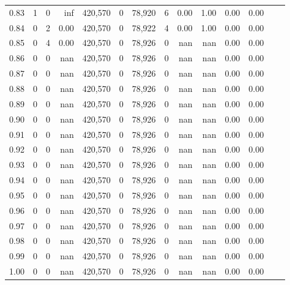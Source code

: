 \begin{tabular}{rrrrrrrrrrrrrr}
0.83 &       1 &      0 &     inf &  420,570 &        0 &  78,920 &       6 &  0.00 &  1.00 &  0.00 &      0.00 \\
0.84 &       0 &      2 &    0.00 &  420,570 &        0 &  78,922 &       4 &  0.00 &  1.00 &  0.00 &      0.00 \\
0.85 &       0 &      4 &    0.00 &  420,570 &        0 &  78,926 &       0 &   nan &   nan &  0.00 &      0.00 \\
0.86 &       0 &      0 &     nan &  420,570 &        0 &  78,926 &       0 &   nan &   nan &  0.00 &      0.00 \\
0.87 &       0 &      0 &     nan &  420,570 &        0 &  78,926 &       0 &   nan &   nan &  0.00 &      0.00 \\
0.88 &       0 &      0 &     nan &  420,570 &        0 &  78,926 &       0 &   nan &   nan &  0.00 &      0.00 \\
0.89 &       0 &      0 &     nan &  420,570 &        0 &  78,926 &       0 &   nan &   nan &  0.00 &      0.00 \\
0.90 &       0 &      0 &     nan &  420,570 &        0 &  78,926 &       0 &   nan &   nan &  0.00 &      0.00 \\
0.91 &       0 &      0 &     nan &  420,570 &        0 &  78,926 &       0 &   nan &   nan &  0.00 &      0.00 \\
0.92 &       0 &      0 &     nan &  420,570 &        0 &  78,926 &       0 &   nan &   nan &  0.00 &      0.00 \\
0.93 &       0 &      0 &     nan &  420,570 &        0 &  78,926 &       0 &   nan &   nan &  0.00 &      0.00 \\
0.94 &       0 &      0 &     nan &  420,570 &        0 &  78,926 &       0 &   nan &   nan &  0.00 &      0.00 \\
0.95 &       0 &      0 &     nan &  420,570 &        0 &  78,926 &       0 &   nan &   nan &  0.00 &      0.00 \\
0.96 &       0 &      0 &     nan &  420,570 &        0 &  78,926 &       0 &   nan &   nan &  0.00 &      0.00 \\
0.97 &       0 &      0 &     nan &  420,570 &        0 &  78,926 &       0 &   nan &   nan &  0.00 &      0.00 \\
0.98 &       0 &      0 &     nan &  420,570 &        0 &  78,926 &       0 &   nan &   nan &  0.00 &      0.00 \\
0.99 &       0 &      0 &     nan &  420,570 &        0 &  78,926 &       0 &   nan &   nan &  0.00 &      0.00 \\
1.00 &       0 &      0 &     nan &  420,570 &        0 &  78,926 &       0 &   nan &   nan &  0.00 &      0.00 \\
\bottomrule
\end{tabular}
